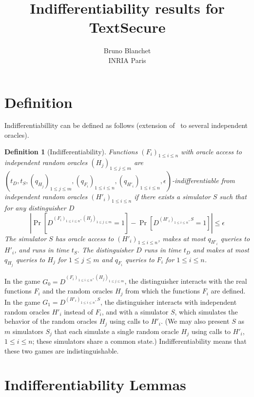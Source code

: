 \documentclass[compsoc, conference, letterpaper, 10pt, times]{IEEEtran}
\newtheorem{definition}{Definition}
\begin{document}
\title{Indifferentiability results for TextSecure}
\author{
{\rm Bruno Blanchet}\\
INRIA Paris
}

\maketitle
\thispagestyle{plain}
\pagestyle{plain}

\section{Definition}

Indifferentiabillity can be defined as follows (extension of~\cite{Coron05}
to several independent oracles).

\begin{definition}[Indifferentiability]
Functions $(F_i)_{1 \leq i \leq n}$ with oracle access to independent random oracles $(H_j)_{1 \leq j \leq m}$ are $(t_D, t_S, (q_{H_j})_{1 \leq j \leq m}, (q_{F_i})_{1 \leq i \leq n}, (q_{H'_i})_{1 \leq i \leq n}, \epsilon)$-indifferentiable from independent random oracles $(H'_i)_{1 \leq i \leq n}$ if there exists a simulator $S$ such that for any distinguisher $D$ 
\[|\Pr[D^{(F_i)_{1 \leq i \leq n},(H_j)_{1 \leq j \leq m}} =1] - \Pr[D^{(H'_i)_{1 \leq i \leq n},S}=1]| \leq \epsilon\]
The simulator $S$ has oracle access to
$(H'_i)_{1 \leq i \leq n}$, makes at most $q_{H'_i}$ queries to $H'_i$,
and runs in time $t_S$. 
The distinguisher $D$ runs in time $t_D$ and makes at most $q_{H_j}$ queries
to $H_j$ for $1 \leq j \leq m$ and $q_{F_i}$ queries to $F_i$ for
$1 \leq i \leq n$.
\end{definition}

In the game $G_0 = D^{(F_i)_{1 \leq i \leq n},(H_j)_{1 \leq j \leq m}}$,
the distinguisher interacts with the real functions $F_i$ and
the random oracles $H_j$ from which the functions $F_i$ are defined.
In the game $G_1 = D^{(H'_i)_{1 \leq i \leq n},S}$,
the distinguisher interacts with independent random oracles $H'_i$ instead of $F_i$, and with a simulator $S$, which simulates the behavior of the random oracles $H_j$ using calls to $H'_i$. (We may also present $S$ as $m$ simulators $S_j$ that each simulate a single random oracle $H_j$ using calls to $H'_i$, $1 \leq i \leq n$; these simulators share a common state.) Indifferentiability means that these two games are indistinguishable.

\section{Indifferentiability Lemmas}
\end{document}

